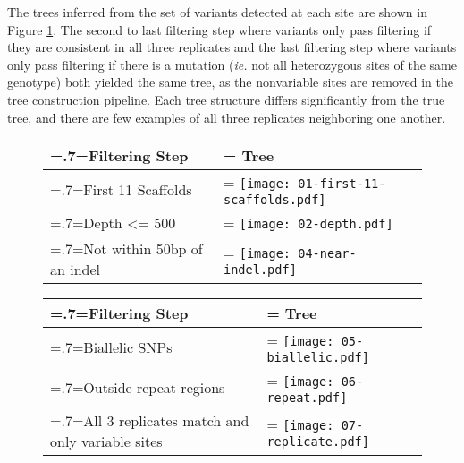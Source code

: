 The trees inferred from the set of variants detected at each site are shown in Figure \ref{fig:ev_filtertrees}. The second to last filtering step where variants only pass filtering if they are consistent in all three replicates and the last filtering step where variants only pass filtering if there is a mutation (\textit{ie.} not all heterozygous sites of the same genotype) both yielded the same tree, as the nonvariable sites are removed in the tree construction pipeline. Each tree structure differs significantly from the true tree, and there are few examples of all three replicates neighboring one another.

\begin{figure}

\centering
\begin{tabularx}{.7\textwidth}{ >{\hsize=.7\hsize\linewidth=\hsize}X >{\hsize=1.3\hsize\linewidth=\hsize}X}
\toprule
Filtering Step & Tree \\
\midrule
First 11 Scaffolds & \texttt{[image: 01-first-11-scaffolds.pdf]} \\
Depth <= 500 & \texttt{[image: 02-depth.pdf]} \\
Not within 50bp of an indel & \texttt{[image: 04-near-indel.pdf]} \\
\bottomrule
\end{tabularx}
\end{figure}

\begin{figure}
\centering
\begin{tabularx}{.7\textwidth}{ >{\hsize=.7\hsize\linewidth=\hsize}X >{\hsize=1.3\hsize\linewidth=\hsize}X }
\toprule
Filtering Step & Tree \\
\midrule
Biallelic SNPs & \texttt{[image: 05-biallelic.pdf]}\\
Outside repeat \newline regions & \texttt{[image: 06-repeat.pdf]} \\
All 3 replicates match and only variable sites & \texttt{[image: 07-replicate.pdf]}\\
\bottomrule
\end{tabularx}
\label{fig:ev_filtertrees}
\end{figure}

